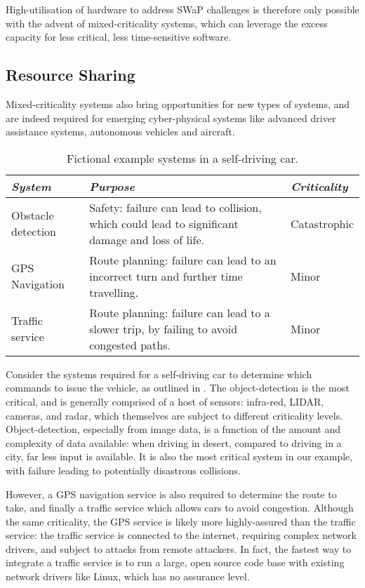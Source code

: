 High-utilisation of hardware to address SWaP challenges is therefore only possible with the advent
of mixed-criticality systems, which can leverage the excess capacity for less critical, less time-sensitive
software.

\subsection{Resource Sharing}

Mixed-criticality systems also bring opportunities for new types of
systems, and are indeed required for emerging cyber-physical systems like
advanced driver assistance systems, autonomous vehicles and aircraft.

\begin{table} 
\centering
\begin{tabularx}{\textwidth}{lXl}\toprule
    \emph{System}            & \emph{Purpose}                                                         & \emph{Criticality} \\\midrule
     Obstacle detection      & Safety: failure can lead to collision, which could lead to significant
    damage and loss of life. & Catastrophic    \\
    \gls{GPS} Navigation     & Route planning:  failure can lead to an incorrect turn and further
    time travelling.         & Minor \\
     Traffic service         & Route planning: failure can lead to a slower trip, by failing to
    avoid congested paths.
    & Minor \\
    \bottomrule
\end{tabularx}
\caption{Fictional example systems in a self-driving car.}
\label{tab:self-driving-car}
\end{table}

Consider the systems required for a self-driving car to determine which commands to issue the vehicle,
as outlined in . The object-detection is the most critical, and is
generally comprised of a host of sensors: infra-red, LIDAR, cameras, and radar, which themselves
are subject to different criticality levels. Object-detection,
especially from image data, is a function of the amount and complexity of data available: when
driving in desert, compared to driving in a city, far less input is available. It is also the
most critical system in our example, with failure leading to potentially disastrous collisions.

However, a GPS navigation service is also required to determine the route to take, and finally a
traffic service which allows cars to avoid congestion. Although the same criticality, the GPS
service is likely more highly-assured than the traffic service: the traffic service is connected to
the internet, requiring complex network drivers, and subject to attacks from remote attackers. 
In fact, the fastest way to integrate a traffic service is to run a large, open source code base
with existing network drivers like Linux, which has no assurance level. 

